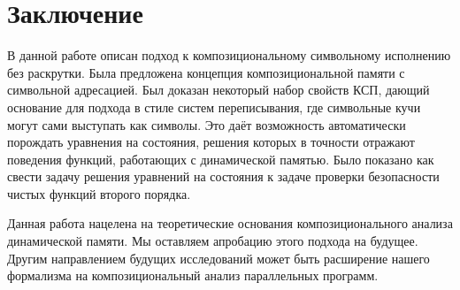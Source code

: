 \section{Заключение}

В данной работе описан подход к композициональному символьному исполнению без раскрутки. Была предложена концепция композициональной памяти с символьной адресацией. Был доказан некоторый набор свойств КСП, дающий основание для подхода в стиле систем переписывания, где символьные кучи могут сами выступать как символы. Это даёт возможность автоматически порождать уравнения на состояния, решения которых в точности отражают поведения функций, работающих с динамической памятью. Было показано как свести задачу решения уравнений на состояния к задаче проверки безопасности чистых функций второго порядка.

Данная работа нацелена на теоретические основания композиционального анализа динамической памяти. Мы оставляем апробацию этого подхода на будущее. Другим направлением будущих исследований может быть расширение нашего формализма на композициональный анализ параллельных программ.